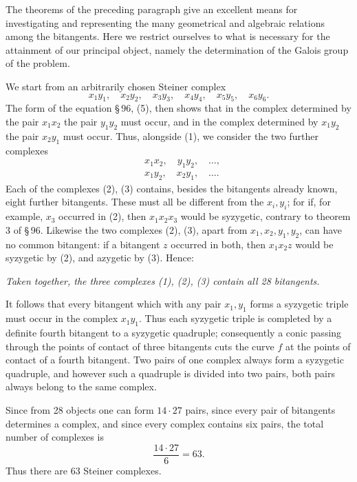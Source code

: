 \documentclass[11pt]{article}
\begin{document}
The theorems of the preceding paragraph give an excellent means for investigating and representing the many geometrical and algebraic relations among the bitangents. Here we restrict ourselves to what is necessary for the attainment of our principal object, namely the determination of the Galois group of the problem.

We start from an arbitrarily chosen Steiner complex
\begin{equation}
 x_1y_1,\quad x_2y_2,\quad x_3y_3,\quad x_4y_4,\quad x_5y_5,\quad x_6y_6.
 \tag{1}
\end{equation}
The form of the equation \S\,96, (5), then shows that in the complex determined by the pair \(x_1x_2\) the pair \(y_1y_2\) must occur, and in the complex determined by \(x_1y_2\) the pair \(x_2y_1\) must occur. Thus, alongside (1), we consider the two further complexes
\begin{align}
&x_1x_2,\quad y_1y_2,\quad \ldots, \tag{2}\\
&x_1y_2,\quad x_2y_1,\quad \ldots. \tag{3}
\end{align}
Each of the complexes (2), (3) contains, besides the bitangents already known, eight further bitangents. These must all be different from the \(x_i,y_i\); for if, for example, \(x_3\) occurred in (2), then \(x_1x_2x_3\) would be syzygetic, contrary to theorem 3 of \S\,96. Likewise the two complexes (2), (3), apart from \(x_1,x_2,y_1,y_2\), can have no common bitangent: if a bitangent \(z\) occurred in both, then \(x_1x_2z\) would be syzygetic by (2), and azygetic by (3). Hence:

\emph{Taken together, the three complexes (1), (2), (3) contain all 28 bitangents.}

It follows that every bitangent which with any pair \(x_1,y_1\) forms a syzygetic triple must occur in the complex \(x_1y_1\). Thus each syzygetic triple is completed by a definite fourth bitangent to a syzygetic quadruple; consequently a conic passing through the points of contact of three bitangents cuts the curve \(f\) at the points of contact of a fourth bitangent. Two pairs of one complex always form a syzygetic quadruple, and however such a quadruple is divided into two pairs, both pairs always belong to the same complex.

Since from 28 objects one can form \(14\cdot27\) pairs, since every pair of bitangents determines a complex, and since every complex contains six pairs, the total number of complexes is
\[
 \frac{14\cdot27}{6}=63.
\]
Thus there are 63 Steiner complexes.
\end{document}
